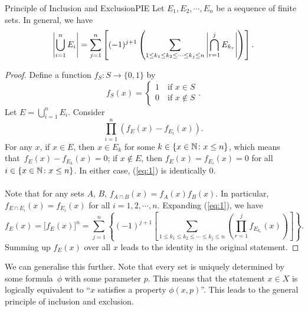 \documentclass[math]{amznotes}
\theoremstyle{remark}
\begin{document}
\begin{thmbox}{Principle of Inclusion and Exclusion}{PIE}
    Let $E_1, E_2, \cdots, E_n$ be a sequence of finite sets. In general, we have
    \begin{equation*}
        {\left\lvert {\bigcup_{i = 1}^n E_i} \right\rvert} = \sum_{j = 1}^{n} \left[(-1)^{j + 1}\left(\sum_{1 \leq k_1 \leq k_2 \leq \cdots \leq k_j \leq n}{\left\lvert {\bigcap_{r = 1}^{j}E_{k_r}} \right\rvert}\right)\right].
    \end{equation*}
    \tcblower
    \begin{proof}
        Define a function $f_S \colon S \to \{0, 1\}$ by
        \begin{equation*}
            f_S(x) = \begin{cases}
                1 \quad \textrm{if } x \in S \\
                0 \quad \textrm{if } x \notin S
            \end{cases}.
        \end{equation*}
        Let $E = \bigcup_{i = 1}^n E_i$. Consider
        \begin{equation}\label{eq:1}
            \prod_{i = 1}^{n}\left(f_E(x) - f_{E_i}(x)\right). \tag{*}
        \end{equation}
        For any $x$, if $x \in E$, then $x \in E_k$ for some $k \in \left\{x \in \mathbb{N} \colon x \leq n\right\}$, which means that~$f_E(x) - f_{E_k}(x) = 0$; if $x \notin E$, then $f_E(x) = f_{E_i}(x) = 0$ for all $i \in \left\{x \in \mathbb{N} \colon x \leq n\right\}$. In either case, (\ref{eq:1}) is identically $0$.
        \\\\
        Note that for any sets $A$, $B$, $f_{A \cap B}(x) = f_A(x)f_B(x)$. In particular, $f_{E \cap E_i}(x) = f_{E_i}(x)$ for all $i = 1, 2, \cdots, n$. Expanding (\ref{eq:1}), we have
        \begin{equation*}
            f_E(x) = \bigl[f_E(x)\bigr]^n = \sum_{j = 1}^{n} \left\{(-1)^{j + 1}\left[\sum_{1 \leq k_1 \leq k_2 \leq \cdots \leq k_j \leq n}\left(\prod_{r = 1}^{j}f_{E_{k_r}}(x)\right)\right]\right\}.
        \end{equation*}
        Summing up $f_E(x)$ over all $x$ leads to the identity in the original statement.
    \end{proof}
\end{thmbox}
We can generalise this further. Note that every set is uniquely determined by some formula~$\phi$ with some parameter $p$. This means that the statement $x \in X$ is logically equivalent to ``$x$ satisfies a property $\phi(x, p)$''. This leads to the general principle of inclusion and exclusion.
\end{document}
